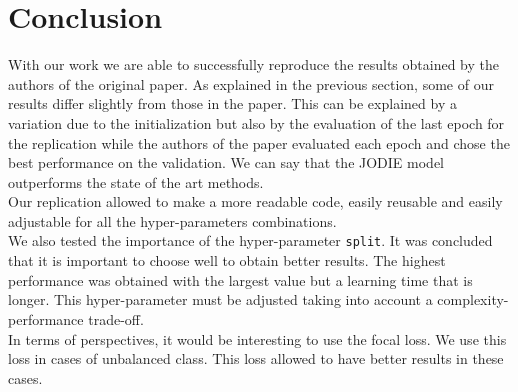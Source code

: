 \section*{Conclusion}
With our work we are able to successfully reproduce the results obtained by the authors of the original paper. As explained in the previous section, some of our results differ slightly from those in the paper. This can be explained by a variation due to the initialization but also by the evaluation of the last epoch for the replication while the authors of the paper evaluated each epoch and chose the best performance on the validation. We can say that the JODIE model outperforms the state of the art methods.\\
Our replication allowed to make a more readable code, easily reusable and easily adjustable for all the hyper-parameters combinations.\\
We also tested the importance of the hyper-parameter \texttt{split}. It was concluded that it is important to choose well to obtain better results. The highest performance was obtained with the largest value but a learning time that is longer. This hyper-parameter must be adjusted taking into account a complexity-performance trade-off.\\
In terms of perspectives, it would be interesting to use the focal loss\supercite{https://doi.org/10.48550/arxiv.1708.02002}. We use this loss in cases of unbalanced class. This loss allowed to have better results in these cases.